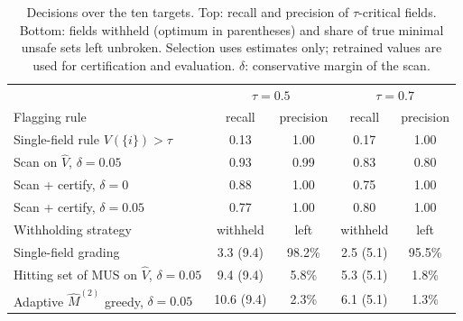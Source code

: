 \begin{table}[!tbp]
\centering\small
\caption{Decisions over the ten targets. Top: recall and precision of $\tau$-critical fields. Bottom: fields withheld (optimum
in parentheses) and share of true minimal unsafe sets left unbroken. Selection uses estimates only; retrained values are used
for certification and evaluation. $\delta$: conservative margin of the scan.}\label{tab:decision}
\begin{tabular}{lcccc}
\toprule
 & \multicolumn{2}{c}{$\tau=0.5$} & \multicolumn{2}{c}{$\tau=0.7$}\\
Flagging rule & recall & precision & recall & precision\\
\midrule
Single-field rule $V(\{i\})>\tau$ & 0.13 & 1.00 & 0.17 & 1.00 \\
Scan on $\hat V$, $\delta=0.05$ & 0.93 & 0.99 & 0.83 & 0.80 \\
Scan + certify, $\delta=0$ & 0.88 & 1.00 & 0.75 & 1.00 \\
Scan + certify, $\delta=0.05$ & 0.77 & 1.00 & 0.80 & 1.00 \\
\midrule
Withholding strategy & withheld & left & withheld & left\\
\midrule
Single-field grading & 3.3 (9.4) & 98.2\% & 2.5 (5.1) & 95.5\% \\
Hitting set of MUS on $\hat V$, $\delta=0.05$ & 9.4 (9.4) & 5.8\% & 5.3 (5.1) & 1.8\% \\
Adaptive $\hat M^{(2)}$ greedy, $\delta=0.05$ & 10.6 (9.4) & 2.3\% & 6.1 (5.1) & 1.3\% \\
\bottomrule
\end{tabular}
\end{table}
